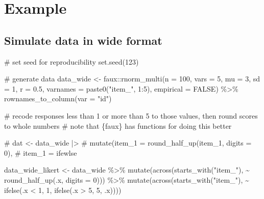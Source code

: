 \documentclass[
  letterpaper,
  DIV=11,
  numbers=noendperiod]{scrreprt}
\newenvironment{Shaded}{\begin{snugshade}}{\end{snugshade}}
\newcommand{\AttributeTok}[1]{\textcolor[rgb]{0.40,0.45,0.13}{#1}}
\newcommand{\CommentTok}[1]{\textcolor[rgb]{0.37,0.37,0.37}{#1}}
\newcommand{\ConstantTok}[1]{\textcolor[rgb]{0.56,0.35,0.01}{#1}}
\newcommand{\DecValTok}[1]{\textcolor[rgb]{0.68,0.00,0.00}{#1}}
\newcommand{\FloatTok}[1]{\textcolor[rgb]{0.68,0.00,0.00}{#1}}
\newcommand{\FunctionTok}[1]{\textcolor[rgb]{0.28,0.35,0.67}{#1}}
\newcommand{\NormalTok}[1]{\textcolor[rgb]{0.00,0.23,0.31}{#1}}
\newcommand{\OtherTok}[1]{\textcolor[rgb]{0.00,0.23,0.31}{#1}}
\newcommand{\SpecialCharTok}[1]{\textcolor[rgb]{0.37,0.37,0.37}{#1}}
\newcommand{\StringTok}[1]{\textcolor[rgb]{0.13,0.47,0.30}{#1}}
\begin{document}
\section{Example}\label{example}

\subsection{Simulate data in wide
format}\label{simulate-data-in-wide-format}

\begin{Shaded}
\begin{Highlighting}[]
\CommentTok{\# set seed for reproducibility}
\FunctionTok{set.seed}\NormalTok{(}\DecValTok{123}\NormalTok{)}

\CommentTok{\# generate data }
\NormalTok{data\_wide }\OtherTok{\textless{}{-}} 
\NormalTok{  faux}\SpecialCharTok{::}\FunctionTok{rnorm\_multi}\NormalTok{(}\AttributeTok{n =} \DecValTok{100}\NormalTok{,}
                    \AttributeTok{vars =} \DecValTok{5}\NormalTok{,}
                    \AttributeTok{mu =} \DecValTok{3}\NormalTok{,}
                    \AttributeTok{sd =} \DecValTok{1}\NormalTok{,}
                    \AttributeTok{r =} \FloatTok{0.5}\NormalTok{,}
                    \AttributeTok{varnames =} \FunctionTok{paste0}\NormalTok{(}\StringTok{"item\_"}\NormalTok{, }\DecValTok{1}\SpecialCharTok{:}\DecValTok{5}\NormalTok{),}
                    \AttributeTok{empirical =} \ConstantTok{FALSE}\NormalTok{) }\SpecialCharTok{\%\textgreater{}\%}
  \FunctionTok{rownames\_to\_column}\NormalTok{(}\AttributeTok{var =} \StringTok{"id"}\NormalTok{)}

\CommentTok{\# recode responses less than 1 or more than 5 to those values, then round scores to whole numbers}
\CommentTok{\# note that \{faux\} has functions for doing this better}


\CommentTok{\# dat \textless{}{-} data\_wide |\textgreater{}}
\CommentTok{\#   mutate(item\_1 = round\_half\_up(item\_1, digits = 0),}
\CommentTok{\#          item\_1 = ifewlse}

\NormalTok{data\_wide\_likert }\OtherTok{\textless{}{-}}\NormalTok{ data\_wide }\SpecialCharTok{\%\textgreater{}\%}
  \FunctionTok{mutate}\NormalTok{(}\FunctionTok{across}\NormalTok{(}\FunctionTok{starts\_with}\NormalTok{(}\StringTok{"item\_"}\NormalTok{), }\SpecialCharTok{\textasciitilde{}} \FunctionTok{round\_half\_up}\NormalTok{(.x, }\AttributeTok{digits =} \DecValTok{0}\NormalTok{))) }\SpecialCharTok{\%\textgreater{}\%}
  \FunctionTok{mutate}\NormalTok{(}\FunctionTok{across}\NormalTok{(}\FunctionTok{starts\_with}\NormalTok{(}\StringTok{"item\_"}\NormalTok{), }\SpecialCharTok{\textasciitilde{}} \FunctionTok{ifelse}\NormalTok{(.x }\SpecialCharTok{\textless{}} \DecValTok{1}\NormalTok{, }\DecValTok{1}\NormalTok{, }\FunctionTok{ifelse}\NormalTok{(.x }\SpecialCharTok{\textgreater{}} \DecValTok{5}\NormalTok{, }\DecValTok{5}\NormalTok{, .x))))}
\end{Highlighting}
\end{Shaded}
\end{document}
